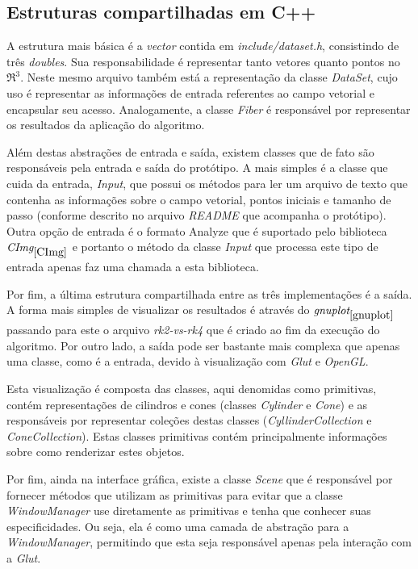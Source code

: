   \subsection{Estruturas compartilhadas em C++}
  A estrutura mais básica é a \textit{vector} contida em \textit{include/dataset.h}, consistindo de três \textit{doubles}. Sua responsabilidade é representar tanto vetores quanto pontos no $\Re ^{3}$. Neste mesmo arquivo também está a representação da classe \textit{DataSet}, cujo uso é representar as informações de entrada referentes ao campo vetorial e encapsular seu acesso. Analogamente, a classe \textit{Fiber} é responsável por representar os resultados da aplicação do algoritmo.
  
  Além destas abstrações de entrada e saída, existem classes que de fato são responsáveis pela entrada e saída do protótipo. A mais simples é a classe que cuida da entrada, \textit{Input}, que possui os métodos para ler um arquivo de texto que contenha as informações sobre o campo vetorial, pontos iniciais e tamanho de passo (conforme descrito no arquivo \textit{README} que acompanha o protótipo). Outra opção de entrada é o formato Analyze que é suportado pelo biblioteca $\textit{CImg}_{\ref{CImg}}$ e portanto o método da classe \textit{Input} que processa este tipo de entrada apenas faz uma chamada a esta biblioteca.
  
  Por fim, a última estrutura compartilhada entre as três implementações é a saída. A forma mais simples de visualizar os resultados é através do $\textit{gnuplot}_{\ref{gnuplot}}$ passando para este o arquivo \textit{rk2-vs-rk4} que é criado ao fim da execução do algoritmo. Por outro lado, a saída pode ser bastante mais complexa que apenas uma classe, como é a entrada, devido à visualização com \textit{Glut} e \textit{OpenGL}.
  
  Esta visualização é composta das classes, aqui denomidas como primitivas, contém representações de cilindros e cones (classes \textit{Cylinder} e \textit{Cone}) e as responsáveis por representar coleções destas classes (\textit{CyllinderCollection} e \textit{ConeCollection}). Estas classes primitivas contém principalmente informações sobre como renderizar estes objetos.
  
  Por fim, ainda na interface gráfica, existe a classe \textit{Scene} que é responsável por fornecer métodos que utilizam as primitivas para evitar que a classe \textit{WindowManager} use diretamente as primitivas e tenha que conhecer suas especificidades. Ou seja, ela é como uma camada de abstração para a \textit{WindowManager}, permitindo que esta seja responsável apenas pela interação com a \textit{Glut}. 
  
